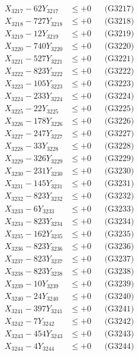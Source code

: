 \documentclass[a4paper,10pt]{article}
\begin{document}
{\begin{align}
X_{3217} - 62Y_{3217} &\leq +0 && \text{(G3217)} \\
X_{3218} - 727Y_{3218} &\leq +0 && \text{(G3218)} \\
X_{3219} - 12Y_{3219} &\leq +0 && \text{(G3219)} \\
X_{3220} - 740Y_{3220} &\leq +0 && \text{(G3220)} \\
\allowbreak
X_{3221} - 527Y_{3221} &\leq +0 && \text{(G3221)} \\
X_{3222} - 823Y_{3222} &\leq +0 && \text{(G3222)} \\
X_{3223} - 105Y_{3223} &\leq +0 && \text{(G3223)} \\
X_{3224} - 233Y_{3224} &\leq +0 && \text{(G3224)} \\
X_{3225} - 22Y_{3225} &\leq +0 && \text{(G3225)} \\
X_{3226} - 178Y_{3226} &\leq +0 && \text{(G3226)} \\
X_{3227} - 247Y_{3227} &\leq +0 && \text{(G3227)} \\
X_{3228} - 33Y_{3228} &\leq +0 && \text{(G3228)} \\
X_{3229} - 326Y_{3229} &\leq +0 && \text{(G3229)} \\
X_{3230} - 231Y_{3230} &\leq +0 && \text{(G3230)} \\
\allowbreak
X_{3231} - 145Y_{3231} &\leq +0 && \text{(G3231)} \\
X_{3232} - 823Y_{3232} &\leq +0 && \text{(G3232)} \\
X_{3233} - 6Y_{3233} &\leq +0 && \text{(G3233)} \\
X_{3234} - 823Y_{3234} &\leq +0 && \text{(G3234)} \\
X_{3235} - 162Y_{3235} &\leq +0 && \text{(G3235)} \\
X_{3236} - 823Y_{3236} &\leq +0 && \text{(G3236)} \\
X_{3237} - 823Y_{3237} &\leq +0 && \text{(G3237)} \\
X_{3238} - 823Y_{3238} &\leq +0 && \text{(G3238)} \\
X_{3239} - 10Y_{3239} &\leq +0 && \text{(G3239)} \\
X_{3240} - 24Y_{3240} &\leq +0 && \text{(G3240)} \\
\allowbreak
X_{3241} - 397Y_{3241} &\leq +0 && \text{(G3241)} \\
X_{3242} - 7Y_{3242} &\leq +0 && \text{(G3242)} \\
X_{3243} - 454Y_{3243} &\leq +0 && \text{(G3243)} \\
X_{3244} - 4Y_{3244} &\leq +0 && \text{(G3244)} \\

\end{align}}
\end{document}
